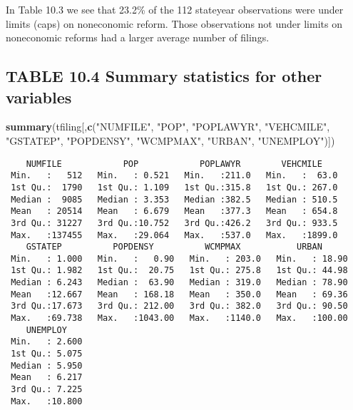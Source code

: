 \documentclass[]{book}
\newenvironment{Shaded}{\begin{snugshade}}{\end{snugshade}}
\newcommand{\KeywordTok}[1]{\textcolor[rgb]{0.13,0.29,0.53}{\textbf{#1}}}
\newcommand{\NormalTok}[1]{#1}
\newcommand{\StringTok}[1]{\textcolor[rgb]{0.31,0.60,0.02}{#1}}
\begin{document}
In Table 10.3 we see that 23.2\% of the 112 stateyear observations were under limits (caps) on noneconomic reform. Those observations not under limits on noneconomic reforms had a larger average number of filings.

\hypertarget{table-10.4-summary-statistics-for-other-variables}{%
\subsection{TABLE 10.4 Summary statistics for other variables}\label{table-10.4-summary-statistics-for-other-variables}}

\begin{Shaded}
\begin{Highlighting}[]
\KeywordTok{summary}\NormalTok{(tfiling[,}\KeywordTok{c}\NormalTok{(}\StringTok{"NUMFILE"}\NormalTok{, }\StringTok{"POP"}\NormalTok{, }\StringTok{"POPLAWYR"}\NormalTok{, }\StringTok{"VEHCMILE"}\NormalTok{, }\StringTok{"GSTATEP"}\NormalTok{, }\StringTok{"POPDENSY"}\NormalTok{, }\StringTok{"WCMPMAX"}\NormalTok{, }\StringTok{"URBAN"}\NormalTok{, }\StringTok{"UNEMPLOY"}\NormalTok{)])}
\end{Highlighting}
\end{Shaded}

\begin{verbatim}
    NUMFILE            POP            POPLAWYR        VEHCMILE     
 Min.   :   512   Min.   : 0.521   Min.   :211.0   Min.   :  63.0  
 1st Qu.:  1790   1st Qu.: 1.109   1st Qu.:315.8   1st Qu.: 267.0  
 Median :  9085   Median : 3.353   Median :382.5   Median : 510.5  
 Mean   : 20514   Mean   : 6.679   Mean   :377.3   Mean   : 654.8  
 3rd Qu.: 31227   3rd Qu.:10.752   3rd Qu.:426.2   3rd Qu.: 933.5  
 Max.   :137455   Max.   :29.064   Max.   :537.0   Max.   :1899.0  
    GSTATEP          POPDENSY          WCMPMAX           URBAN       
 Min.   : 1.000   Min.   :   0.90   Min.   : 203.0   Min.   : 18.90  
 1st Qu.: 1.982   1st Qu.:  20.75   1st Qu.: 275.8   1st Qu.: 44.98  
 Median : 6.243   Median :  63.90   Median : 319.0   Median : 78.90  
 Mean   :12.667   Mean   : 168.18   Mean   : 350.0   Mean   : 69.36  
 3rd Qu.:17.673   3rd Qu.: 212.00   3rd Qu.: 382.0   3rd Qu.: 90.50  
 Max.   :69.738   Max.   :1043.00   Max.   :1140.0   Max.   :100.00  
    UNEMPLOY     
 Min.   : 2.600  
 1st Qu.: 5.075  
 Median : 5.950  
 Mean   : 6.217  
 3rd Qu.: 7.225  
 Max.   :10.800  
\end{verbatim}
\end{document}
